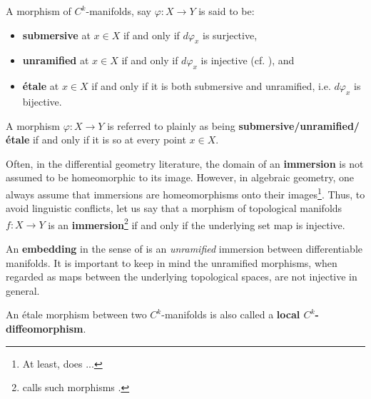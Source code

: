         \begin{definition} \label{def: submersive_unramified_and_etale_morphisms}
            A morphism of $C^k$-manifolds, say $\varphi: X \to Y$ is said to be:
            \begin{itemize}
                \item \textbf{submersive} at $x \in X$ if and only if $d\varphi_x$ is surjective,
                \item \textbf{unramified} at $x \in X$ if and only if $d\varphi_x$ is injective (cf. \cite[\href{https://stacks.math.columbia.edu/tag/0B2G}{Tag 0B2G}]{stacks}), and
                \item \textbf{\'etale} at $x \in X$ if and only if it is both submersive and unramified, i.e. $d\varphi_x$ is bijective.
            \end{itemize}

            A morphism $\varphi: X \to Y$ is referred to plainly as being \textbf{submersive/unramified/\'etale} if and only if it is so at every point $x \in X$.
        \end{definition}
        \begin{convention}[Immersions]
            Often, in the differential geometry literature, the domain of an \textbf{immersion} is not assumed to be homeomorphic to its image. However, in algebraic geometry, one always assume that immersions are homeomorphisms onto their images\footnote{At least, \cite{stacks} does ...}. Thus, to avoid linguistic conflicts, let us say that a morphism of topological manifolds $f: X \to Y$ is an \textbf{immersion}\footnote{\cite{lee_smooth_manifolds} calls such morphisms .} if and only if the underlying set map is injective.
            
            An \textbf{embedding} in the sense of \cite{lee_smooth_manifolds} is an \textit{unramified} immersion between differentiable manifolds. It is important to keep in mind the unramified morphisms, when regarded as maps between the underlying topological spaces, are not injective in general.
        \end{convention}
        \begin{convention}
            An \'etale morphism between two $C^k$-manifolds is also called a \textbf{local $C^k$-diffeomorphism}.
        \end{convention}

